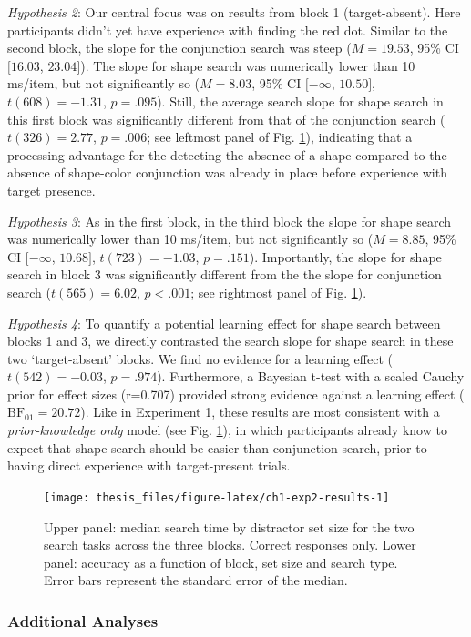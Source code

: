 \documentclass[12pt,twoside]{reedthesis}
\begin{document}
\emph{Hypothesis 2}: Our central focus was on results from block 1 (target-absent). Here participants didn't yet have experience with finding the red dot. Similar to the second block, the slope for the conjunction search was steep (\(M = 19.53\), 95\% CI \([16.03\), \(23.04]\)). The slope for shape search was numerically lower than 10 ms/item, but not significantly so (\(M = 8.03\), 95\% CI \([-\infty\), \(10.50]\), \(t(608) = -1.31\), \(p = .095\)). Still, the average search slope for shape search in this first block was significantly different from that of the conjunction search (\(t(326) = 2.77\), \(p = .006\); see leftmost panel of Fig. \ref{fig:ch1-exp2-results}), indicating that a processing advantage for the detecting the absence of a shape compared to the absence of shape-color conjunction was already in place before experience with target presence.

\emph{Hypothesis 3}: As in the first block, in the third block the slope for shape search was numerically lower than 10 ms/item, but not significantly so (\(M = 8.85\), 95\% CI \([-\infty\), \(10.68]\), \(t(723) = -1.03\), \(p = .151\)). Importantly, the slope for shape search in block 3 was significantly different from the the slope for conjunction search (\(t(565) = 6.02\), \(p < .001\); see rightmost panel of Fig. \ref{fig:ch1-exp2-results}).

\emph{Hypothesis 4}: To quantify a potential learning effect for shape search between blocks 1 and 3, we directly contrasted the search slope for shape search in these two `target-absent' blocks. We find no evidence for a learning effect (\(t(542) = -0.03\), \(p = .974\)). Furthermore, a Bayesian t-test with a scaled Cauchy prior for effect sizes (r=0.707) provided strong evidence against a learning effect (\(\mathrm{BF}_{\textrm{01}} = 20.72\)). Like in Experiment 1, these results are most consistent with a \emph{prior-knowledge only} model (see Fig. \ref{fig:ch1-exp2-results}), in which participants already know to expect that shape search should be easier than conjunction search, prior to having direct experience with target-present trials.
\begin{figure}[H]
\texttt{[image: thesis\_files/figure-latex/ch1-exp2-results-1]} \caption{Upper panel: median search time by distractor set size for the two search tasks across the three blocks. Correct responses only. Lower panel: accuracy as a function of block, set size and search type. Error bars represent the standard error of the median.}\label{fig:ch1-exp2-results}
\end{figure}
\hypertarget{additional-analyses-1}{%
\subsubsection*{Additional Analyses}\label{additional-analyses-1}}
\end{document}
